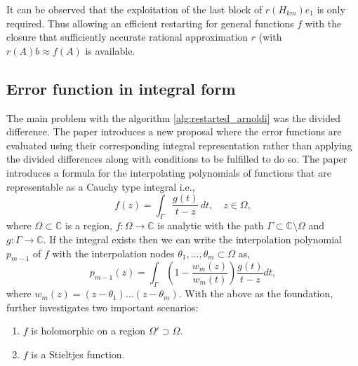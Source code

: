It can be observed that the exploitation of the last block of $r(H_{km})e_{1}$ is only required. Thus allowing an efficient restarting for general functions $f$ with the closure that sufficiently accurate rational approximation $r$ (with $r(A)b \approx f(A)$ is available.

\subsection{Error function in integral form}
\label{sec:error_func_int_form}

The main problem with the algorithm \ref{alg:restarted_arnoldi} was the divided difference. The paper \cite{52} introduces a new proposal where the error functions are evaluated using their corresponding integral representation rather than applying the divided differences along with conditions to be fulfilled to do so. The paper introduces a formula for the interpolating polynomials of functions that are representable as a Cauchy type integral i.e.,
\begin{equation}
    f(z) = \int_{\Gamma} \frac{g(t)}{t - z} \, dt, \quad z \in \Omega,
    \label{eq:2.48}
\end{equation}
where $\Omega \subset \mathbb{C}$ is a region, $f : \Omega \to \mathbb{C}$ is analytic with the path $\Gamma \subset \mathbb{C} \setminus \Omega$ and $g : \Gamma \to \mathbb{C}$. If the integral exists then we can write the interpolation polynomial $p_{m-1}$ of $f$ with the interpolation nodes $\theta_{1},\dots,\theta_{m} \subset \Omega$ as,
\begin{equation}
    p_{m-1}(z) = \int_{\Gamma} \left(1 - \frac{w_{m}(z)}{w_{m}(t)}\right) \frac{g(t)}{t - z}dt,
    \label{eq:2.49}
\end{equation}
where $w_{m}(z)=(z-\theta_{1})\dots(z-\theta_{m})$. With the above as the foundation, \cite{52} further investigates two important scenarios:

\begin{enumerate}
    \item $f$ is holomorphic on a region $\Omega' \supset \Omega$.
    \item $f$ is a Stieltjes function.
\end{enumerate}

